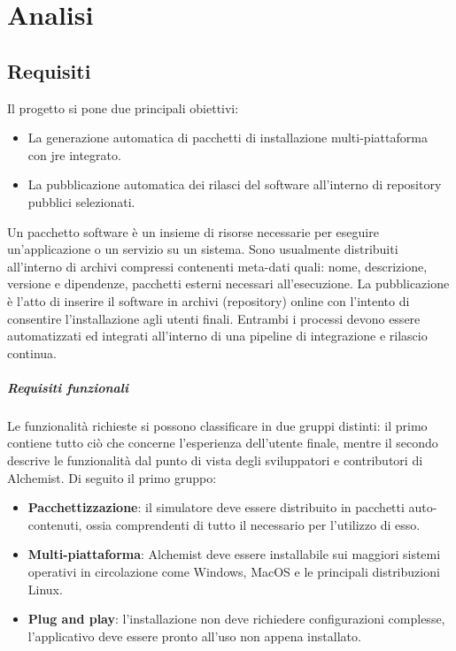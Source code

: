 
\chapter{Analisi}

\section{Requisiti}

Il progetto si pone due principali obiettivi:
\begin{itemize}
	\item La generazione automatica di pacchetti di installazione multi-piattaforma \\ con \ac{jre} integrato.
	\item La pubblicazione automatica dei rilasci del software all'interno di repository pubblici selezionati.
\end{itemize}
Un pacchetto software è un insieme di risorse necessarie per eseguire un'applicazione o un servizio su un sistema. Sono usualmente distribuiti all'interno di archivi compressi contenenti meta-dati quali: nome, descrizione, versione e dipendenze, pacchetti esterni necessari all'esecuzione. La pubblicazione è l'atto di inserire il software in archivi (repository) online con l'intento di consentire l'installazione agli utenti finali. Entrambi i processi devono essere automatizzati ed integrati all'interno di una pipeline di integrazione e rilascio continua.

\paragraph{Requisiti funzionali}

Le funzionalità richieste si possono classificare in due gruppi distinti: il primo contiene tutto ciò che concerne l'esperienza dell'utente finale, mentre il secondo descrive le funzionalità dal punto di vista degli sviluppatori e contributori di Alchemist. Di seguito il primo gruppo:
\begin{itemize}
	\item \textbf{Pacchettizzazione}: il simulatore deve essere distribuito in pacchetti auto-contenuti, ossia comprendenti di tutto il necessario per l'utilizzo di esso.
	\item \textbf{Multi-piattaforma}: Alchemist deve essere installabile sui maggiori sistemi operativi in circolazione come Windows, MacOS e le principali distribuzioni Linux.
	\item \textbf{Plug and play}: l'installazione non deve richiedere configurazioni complesse, l'applicativo deve essere pronto all'uso non appena installato.
\end{itemize}

